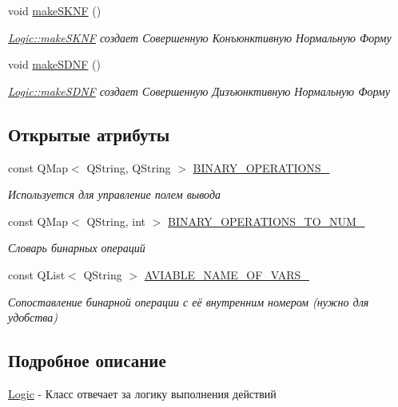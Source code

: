 \begin{DoxyCompactItemize}
void \hyperlink{class_logic_a008dd758dde00f1f5940558f275ec216}{make\+S\+K\+NF} ()
\begin{DoxyCompactList}\small\item\em \hyperlink{class_logic_a008dd758dde00f1f5940558f275ec216}{Logic\+::make\+S\+K\+NF} создает Совершенную Конъюнктивную Нормальную Форму \end{DoxyCompactList}\item 
void \hyperlink{class_logic_a1494325c8d91b7fe5728b7dbdf82fca3}{make\+S\+D\+NF} ()
\begin{DoxyCompactList}\small\item\em \hyperlink{class_logic_a1494325c8d91b7fe5728b7dbdf82fca3}{Logic\+::make\+S\+D\+NF} создает Совершенную Дизъюнктивную Нормальную Форму \end{DoxyCompactList}\end{DoxyCompactItemize}
\subsection*{Открытые атрибуты}
\begin{DoxyCompactItemize}
\item 
const Q\+Map$<$ Q\+String, Q\+String $>$ \hyperlink{class_logic_a87779b9da5a43f388cbb26982502e989}{B\+I\+N\+A\+R\+Y\+\_\+\+O\+P\+E\+R\+A\+T\+I\+O\+N\+S\+\_\+}
\begin{DoxyCompactList}\small\item\em Используется для управление полем вывода \end{DoxyCompactList}\item 
const Q\+Map$<$ Q\+String, int $>$ \hyperlink{class_logic_a80a5ac2ef983887c55d5b64e941b9dbe}{B\+I\+N\+A\+R\+Y\+\_\+\+O\+P\+E\+R\+A\+T\+I\+O\+N\+S\+\_\+\+T\+O\+\_\+\+N\+U\+M\+\_\+}
\begin{DoxyCompactList}\small\item\em Словарь бинарных операций \end{DoxyCompactList}\item 
const Q\+List$<$ Q\+String $>$ \hyperlink{class_logic_a5d00b20d2c2a531f8796581f49fa7d5a}{A\+V\+I\+A\+B\+L\+E\+\_\+\+N\+A\+M\+E\+\_\+\+O\+F\+\_\+\+V\+A\+R\+S\+\_\+}
\begin{DoxyCompactList}\small\item\em Сопоставление бинарной операции с её внутренним номером (нужно для удобства) \end{DoxyCompactList}\end{DoxyCompactItemize}


\subsection{Подробное описание}
\hyperlink{class_logic}{Logic} -\/ Класс отвечает за логику выполнения действий 

